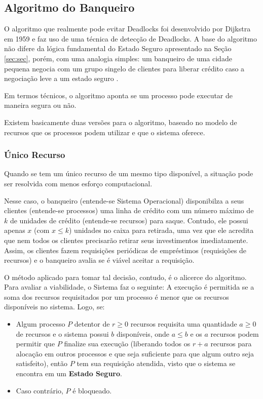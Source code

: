 	\subsection{Algoritmo do Banqueiro}
	O algoritmo que realmente pode evitar Deadlocks foi desenvolvido por Dijkstra em 1959 e faz uso de uma técnica de detecção de Deadlocks. A base do algoritmo não difere da lógica fundamental do Estado Seguro apresentado na Seção \ref{sec:sec}, porém, com uma analogia simples: um banqueiro de uma cidade pequena negocia com um grupo singelo de clientes para liberar crédito caso a negociação leve a um estado seguro \cite{livro:tenembaum}.

	Em termos técnicos, o algoritmo aponta se um processo pode executar de maneira segura ou não.

	Existem basicamente duas versões para o algoritmo, baseado no modelo de recursos que os processos podem utilizar e que o sistema oferece.

	\subsubsection{Único Recurso}\label{sec:banun}
	Quando se tem um único recurso de um mesmo tipo disponível, a situação pode ser resolvida com menos esforço computacional.

	Nesse caso, o banqueiro (entende-se Sistema Operacional) disponibilza a seus clientes (entende-se processos) uma linha de crédito com um número máximo de $k$ de unidades de crédito (entende-se recursos) para saque. Contudo, ele possui apenas $x$ (com $x \leq k$) unidades no caixa para retirada, uma vez que ele acredita que nem todos os clientes precisarão retirar seus investimentos imediatamente. Assim, os clientes fazem requisições periódicas de empréstimos (requisições de recursos) e o banqueiro avalia se é viável aceitar a requisição.

	O método aplicado para tomar tal decisão, contudo, é o alicerce do algoritmo. Para avaliar a viabilidade, o Sistema faz o seguinte: A execução é permitida se a soma dos recursos requisitados por um processo é menor que os recursos disponíveis no sistema. Logo, se:
	\begin{itemize}
		\item Algum processo $P$ detentor de $r \geq 0$ recursos requisita uma quantidade $a \geq 0$ de recursos e o sistema possui $b$ disponíveis, onde $a \leq b$ e os $a$ recursos podem permitir que $P$ finalize sua execução (liberando todos os $r + a$ recursos para alocação em outros processos e que seja suficiente para que algum outro seja satisfeito), então $P$ tem sua requisição atendida, visto que o sistema se encontra em um \textbf{Estado Seguro}.
		\item Caso contrário, $P$ é bloqueado.
	\end{itemize}

